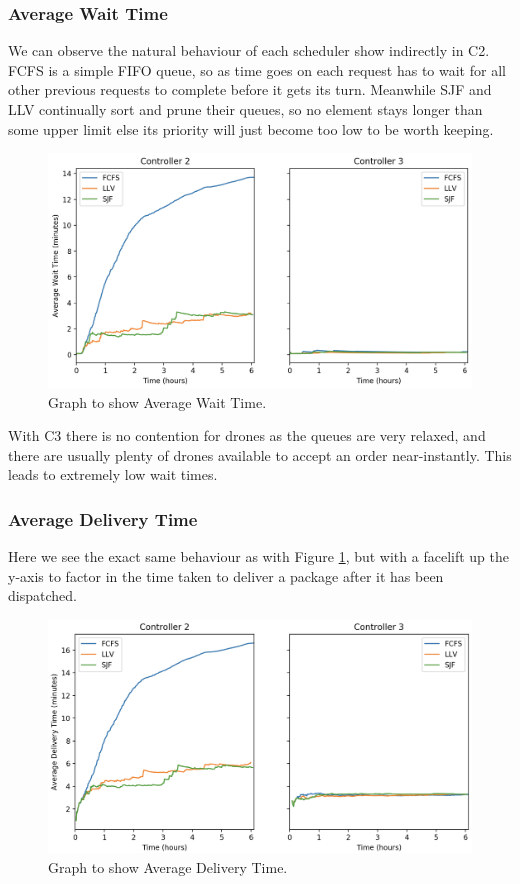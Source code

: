 \documentclass[a4paper,11pt,titlepage]{report}
\begin{document}
\subsubsection{Average Wait Time}
We can observe the natural behaviour of each scheduler show indirectly in C2. FCFS is a simple FIFO queue, so as time goes on each request has to wait for all other previous requests to complete before it gets its turn. Meanwhile SJF and LLV continually sort and prune their queues, so no element stays longer than some upper limit else its priority will just become too low to be worth keeping.

\begin{figure}[!hbpt]
  \center
  \includegraphics[width=\linewidth]{img/small/avgwaittime.png}
  \caption{Graph to show Average Wait Time.}
  \label{fig:small_avgwaittime}
\end{figure}

With C3 there is no contention for drones as the queues are very relaxed, and there are usually plenty of drones available to accept an order near-instantly. This leads to extremely low wait times.

\clearpage
\subsubsection{Average Delivery Time}
Here we see the exact same behaviour as with Figure \ref{fig:small_avgwaittime}, but with a facelift up the y-axis to factor in the time taken to deliver a package after it has been dispatched.

\begin{figure}[!hbpt]
  \center
  \includegraphics[width=0.95\linewidth]{img/small/avgdeltime.png}
  \caption{Graph to show Average Delivery Time.}
  \label{fig:small_avgdeltime}
\end{figure}
\end{document}
